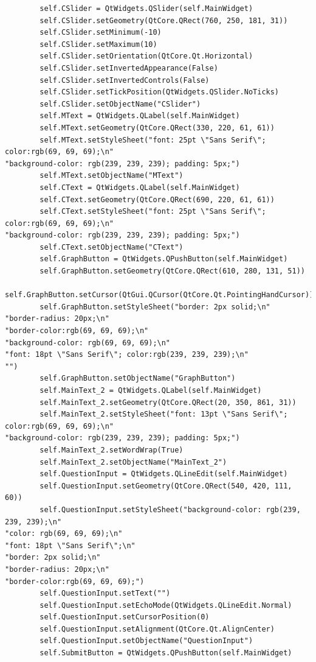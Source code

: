 \documentclass[12pt]{article}
\begin{document}
\begin{lstlisting}
        self.CSlider = QtWidgets.QSlider(self.MainWidget)
        self.CSlider.setGeometry(QtCore.QRect(760, 250, 181, 31))
        self.CSlider.setMinimum(-10)
        self.CSlider.setMaximum(10)
        self.CSlider.setOrientation(QtCore.Qt.Horizontal)
        self.CSlider.setInvertedAppearance(False)
        self.CSlider.setInvertedControls(False)
        self.CSlider.setTickPosition(QtWidgets.QSlider.NoTicks)
        self.CSlider.setObjectName("CSlider")
        self.MText = QtWidgets.QLabel(self.MainWidget)
        self.MText.setGeometry(QtCore.QRect(330, 220, 61, 61))
        self.MText.setStyleSheet("font: 25pt \"Sans Serif\"; color:rgb(69, 69, 69);\n"
"background-color: rgb(239, 239, 239); padding: 5px;")
        self.MText.setObjectName("MText")
        self.CText = QtWidgets.QLabel(self.MainWidget)
        self.CText.setGeometry(QtCore.QRect(690, 220, 61, 61))
        self.CText.setStyleSheet("font: 25pt \"Sans Serif\"; color:rgb(69, 69, 69);\n"
"background-color: rgb(239, 239, 239); padding: 5px;")
        self.CText.setObjectName("CText")
        self.GraphButton = QtWidgets.QPushButton(self.MainWidget)
        self.GraphButton.setGeometry(QtCore.QRect(610, 280, 131, 51))
        self.GraphButton.setCursor(QtGui.QCursor(QtCore.Qt.PointingHandCursor))
        self.GraphButton.setStyleSheet("border: 2px solid;\n"
"border-radius: 20px;\n"
"border-color:rgb(69, 69, 69);\n"
"background-color: rgb(69, 69, 69);\n"
"font: 18pt \"Sans Serif\"; color:rgb(239, 239, 239);\n"
"")
        self.GraphButton.setObjectName("GraphButton")
        self.MainText_2 = QtWidgets.QLabel(self.MainWidget)
        self.MainText_2.setGeometry(QtCore.QRect(20, 350, 861, 31))
        self.MainText_2.setStyleSheet("font: 13pt \"Sans Serif\"; color:rgb(69, 69, 69);\n"
"background-color: rgb(239, 239, 239); padding: 5px;")
        self.MainText_2.setWordWrap(True)
        self.MainText_2.setObjectName("MainText_2")
        self.QuestionInput = QtWidgets.QLineEdit(self.MainWidget)
        self.QuestionInput.setGeometry(QtCore.QRect(540, 420, 111, 60))
        self.QuestionInput.setStyleSheet("background-color: rgb(239, 239, 239);\n"
"color: rgb(69, 69, 69);\n"
"font: 18pt \"Sans Serif\";\n"
"border: 2px solid;\n"
"border-radius: 20px;\n"
"border-color:rgb(69, 69, 69);")
        self.QuestionInput.setText("")
        self.QuestionInput.setEchoMode(QtWidgets.QLineEdit.Normal)
        self.QuestionInput.setCursorPosition(0)
        self.QuestionInput.setAlignment(QtCore.Qt.AlignCenter)
        self.QuestionInput.setObjectName("QuestionInput")
        self.SubmitButton = QtWidgets.QPushButton(self.MainWidget)

\end{lstlisting}
\end{document}
